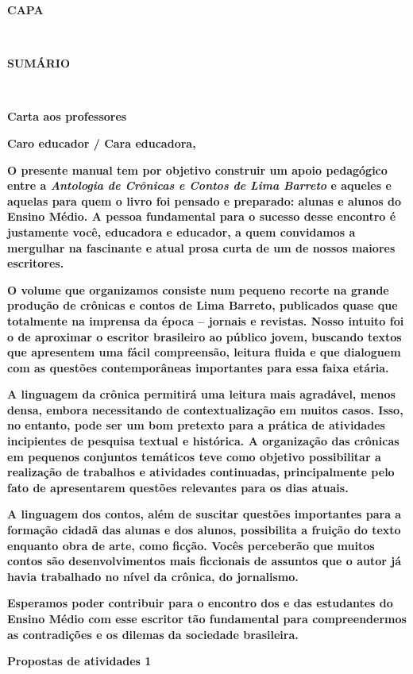 \textbf{CAPA}

\textbf{\\
}

\textbf{SUMÁRIO}

\textbf{\\
}

\textbf{Carta aos professores}

\textbf{Caro educador / Cara educadora,}

\textbf{O presente manual tem por objetivo construir um apoio pedagógico
entre a \emph{Antologia de Crônicas e Contos de Lima Barreto} e aqueles
e aquelas para quem o livro foi pensado e preparado: alunas e alunos do
Ensino Médio. A pessoa fundamental para o sucesso desse encontro é
justamente você, educadora e educador, a quem convidamos a mergulhar na
fascinante e atual prosa curta de um de nossos maiores escritores.}

\textbf{O volume que organizamos consiste num pequeno recorte na grande
produção de crônicas e contos de Lima Barreto, publicados quase que
totalmente na imprensa da época -- jornais e revistas. Nosso intuito foi
o de aproximar o escritor brasileiro ao público jovem, buscando textos
que apresentem uma fácil compreensão, leitura fluida e que dialoguem com
as questões contemporâneas importantes para essa faixa etária.}

\textbf{A linguagem da crônica permitirá uma leitura mais agradável,
menos densa, embora necessitando de contextualização em muitos casos.
Isso, no entanto, pode ser um bom pretexto para a prática de atividades
incipientes de pesquisa textual e histórica. A organização das crônicas
em pequenos conjuntos temáticos teve como objetivo possibilitar a
realização de trabalhos e atividades continuadas, principalmente pelo
fato de apresentarem questões relevantes para os dias atuais.}

\textbf{A linguagem dos contos, além de suscitar questões importantes
para a formação cidadã das alunas e dos alunos, possibilita a fruição do
texto enquanto obra de arte, como ficção. Vocês perceberão que muitos
contos são desenvolvimentos mais ficcionais de assuntos que o autor já
havia trabalhado no nível da crônica, do jornalismo. }

\textbf{Esperamos poder contribuir para o encontro dos e das estudantes
do Ensino Médio com esse escritor tão fundamental para compreendermos as
contradições e os dilemas da sociedade brasileira. }

\textbf{Propostas de atividades 1}

